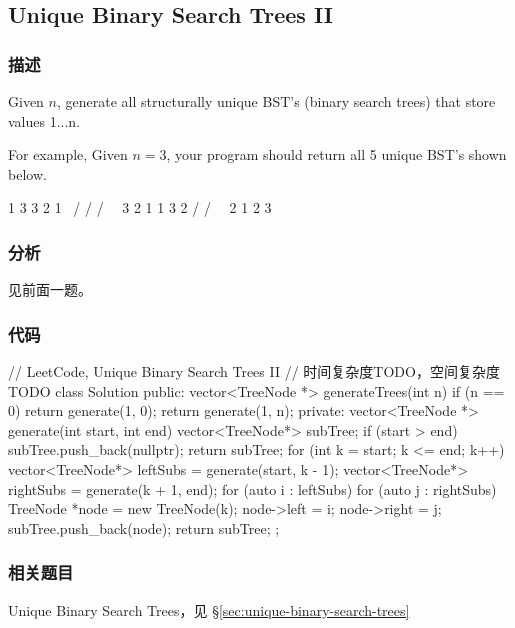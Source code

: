 \subsection{Unique Binary Search Trees II}
\label{sec:unique-binary-search-trees-ii}


\subsubsection{描述}
Given $n$, generate all structurally unique BST's (binary search trees) that store values 1...n.

For example,
Given $n = 3$, your program should return all 5 unique BST's shown below.
\begin{Code}
   1         3     3      2      1
    \       /     /      / \      \
     3     2     1      1   3      2
    /     /       \                 \
   2     1         2                 3
\end{Code}


\subsubsection{分析}
见前面一题。


\subsubsection{代码}

\begin{Code}
// LeetCode, Unique Binary Search Trees II
// 时间复杂度TODO，空间复杂度TODO
class Solution {
public:
    vector<TreeNode *> generateTrees(int n) {
        if (n == 0) return generate(1, 0);
        return generate(1, n);
    }
private:
    vector<TreeNode *> generate(int start, int end) {
        vector<TreeNode*> subTree;
        if (start > end) {
            subTree.push_back(nullptr);
            return subTree;
        }
        for (int k = start; k <= end; k++) {
            vector<TreeNode*> leftSubs = generate(start, k - 1);
            vector<TreeNode*> rightSubs = generate(k + 1, end);
            for (auto i : leftSubs) {
                for (auto j : rightSubs) {
                    TreeNode *node = new TreeNode(k);
                    node->left = i;
                    node->right = j;
                    subTree.push_back(node);
                }
            }
        }
        return subTree;
    }
};
\end{Code}


\subsubsection{相关题目}
\begindot
\item Unique Binary Search Trees，见 \S \ref{sec:unique-binary-search-trees}
\myenddot



